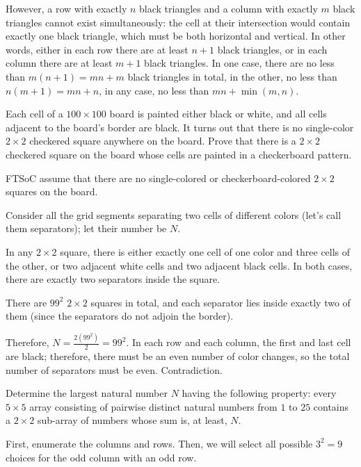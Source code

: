 However, a row with exactly $n$ black triangles and a column with exactly $m$ black triangles cannot exist simultaneously: the cell at their intersection would contain exactly one black triangle, which must be both horizontal and vertical. In other words, either in each row there are at least $n+1$ black triangles, or in each column there are at least $m+1$ black triangles. In one case, there are no less than $m(n+1)=mn+m$ black triangles in total, in the other, no less than $n(m+1)=mn+n$, in any case, no less than $mn+\min(m,n)$.

\begin{example}
    Each cell of a $100\times 100$ board is painted either black or white, and all cells adjacent to the board's border are black. It turns out that there is no single-color $2\times 2$ checkered square anywhere on the board. Prove that there is a $2\times 2$ checkered square on the board whose cells are painted in a checkerboard pattern.
\end{example}

\sol FTSoC assume that there are no single-colored or checkerboard-colored $2\times 2$ squares on the board.

Consider all the grid segments separating two cells of different colors (let's call them separators); let their number be $N$.

In any $2\times 2$ square, there is either exactly one cell of one color and three cells of the other, or two adjacent white cells and two adjacent black cells. In both cases, there are exactly two separators inside the square.

There are $99^2$ $2\times 2$ squares in total, and each separator lies inside exactly two of them (since the separators do not adjoin the border).

Therefore, $N = \frac{2(99^2)}{2} = 99^2$. In each row and each column, the first and last cell are black; therefore, there must be an even number of color changes, so the total number of separators must be even. Contradiction.

\begin{example}[BMO SL 2019]
    Determine the largest natural number $N$ having the following property: every $5\times 5$ array consisting of pairwise distinct natural numbers from $1$ to $25$ contains a $2\times 2$ sub-array of numbers whose sum is, at least, $N$.
\end{example}


First, enumerate the columns and rows. Then, we will select all possible $3^2 = 9$ choices for the odd column with an odd row.

